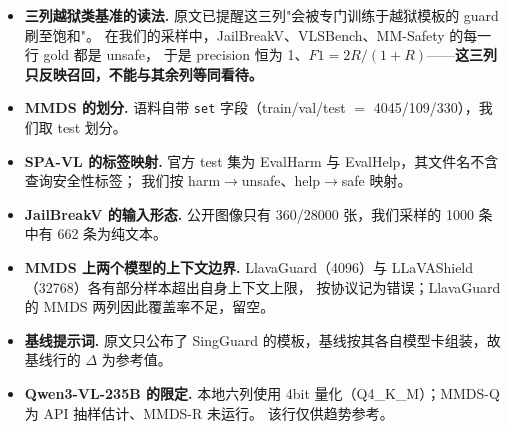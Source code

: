 \documentclass[10pt]{article}
\begin{document}
\begin{itemize}\itemsep4pt
  \item \textbf{三列越狱类基准的读法.}
        原文已提醒这三列"会被专门训练于越狱模板的 guard 刷至饱和"。
        在我们的采样中，JailBreakV、VLSBench、MM-Safety 的每一行 gold 都是 unsafe，
        于是 precision 恒为 1、$F1 = 2R/(1+R)$------\textbf{这三列只反映召回，不能与其余列等同看待。}
  \item \textbf{MMDS 的划分.}
        语料自带 \texttt{set} 字段（train/val/test $=$ 4045/109/330），我们取 test 划分。
  \item \textbf{SPA-VL 的标签映射.}
        官方 test 集为 EvalHarm 与 EvalHelp，其文件名不含查询安全性标签；
        我们按 harm$\rightarrow$unsafe、help$\rightarrow$safe 映射。
  \item \textbf{JailBreakV 的输入形态.}
        公开图像只有 360/28000 张，我们采样的 1000 条中有 662 条为纯文本。
  \item \textbf{MMDS 上两个模型的上下文边界.}
        LlavaGuard（4096）与 LLaVAShield（32768）各有部分样本超出自身上下文上限，
        按协议记为错误；LlavaGuard 的 MMDS 两列因此覆盖率不足，留空。
  \item \textbf{基线提示词.}
        原文只公布了 SingGuard 的模板，基线按其各自模型卡组装，故基线行的 $\Delta$ 为参考值。
  \item \textbf{Qwen3-VL-235B 的限定.}
        本地六列使用 4bit 量化（Q4\_K\_M）；MMDS-Q 为 API 抽样估计、MMDS-R 未运行。
        该行仅供趋势参考。
\end{itemize}
\end{document}
